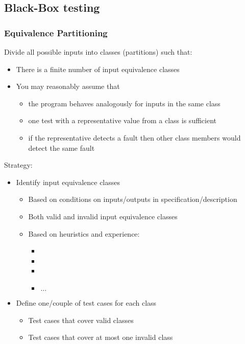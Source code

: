 \subsection{Black-Box testing}

\subsubsection{Equivalence Partitioning}

Divide all possible inputs into classes (partitions) such that:
\begin{itemize}
	\item There is a finite number of input equivalence classes
	\item You may reasonably assume that
	\begin{itemize}
		\item the program behaves analogously for inputs in the same class
		\item one test with a representative value from a class is sufficient
		\item if the representative detects a fault
		then other class members would detect the same fault
	\end{itemize}
\end{itemize}


Strategy:
\begin{itemize}
	\item Identify input equivalence classes
	\begin{itemize}
		\item Based on conditions on inputs/outputs in specification/description
		\item Both valid and invalid input equivalence classes
		\item Based on heuristics and experience:
		\begin{itemize}
			\item
			\item
			\item
			\item$\ldots$
		\end{itemize}
	\end{itemize}
	\item Define one/couple of test cases for each class
	\begin{itemize}
		\item Test cases that cover valid classes
		\item Test cases that cover at most one invalid class
	\end{itemize}
\end{itemize}

